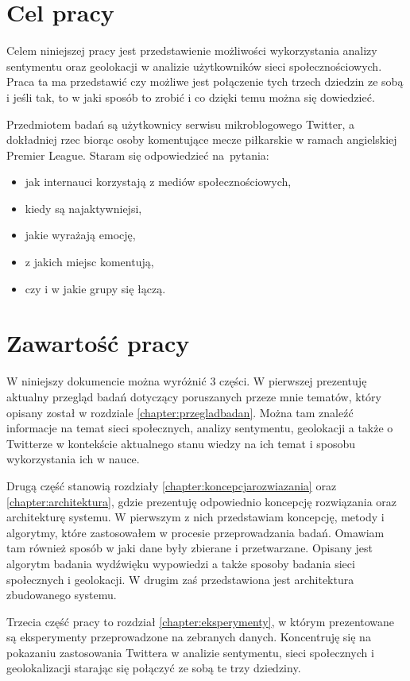 \section{Cel pracy}
Celem niniejszej pracy jest przedstawienie możliwości wykorzystania
analizy sentymentu oraz geolokacji w analizie użytkowników sieci
społecznościowych. Praca ta ma przedstawić czy możliwe jest połączenie tych
trzech dziedzin ze sobą i jeśli tak, to w jaki sposób to zrobić i co dzięki
temu można się dowiedzieć.

Przedmiotem badań są użytkownicy serwisu mikroblogowego Twitter, a dokładniej
rzec biorąc osoby komentujące mecze piłkarskie w ramach angielskiej Premier
League.
Staram się odpowiedzieć na~pytania:
\begin{itemize}
  \item jak internauci korzystają z mediów społecznościowych,
  \item kiedy są najaktywniejsi,
  \item jakie wyrażają emocję,
  \item z jakich miejsc komentują,
  \item czy i w jakie grupy się łączą.
\end{itemize}

\section{Zawartość pracy}
W niniejszy dokumencie można wyróżnić 3 części. W pierwszej prezentuję
aktualny przegląd badań dotyczący poruszanych przeze mnie tematów, który
opisany został w rozdziale \ref{chapter:przegladbadan}. Można tam znaleźć
informacje na temat sieci społecznych, analizy sentymentu, geolokacji
a także o Twitterze w kontekście aktualnego stanu wiedzy na ich temat i sposobu
wykorzystania ich w nauce.

Drugą część stanowią rozdziały \ref{chapter:koncepcjarozwiazania} oraz
\ref{chapter:architektura}, gdzie prezentuję odpowiednio koncepcję rozwiązania
oraz architekturę systemu. W pierwszym z nich przedstawiam koncepcję, metody i
algorytmy, które zastosowałem w procesie przeprowadzania badań. Omawiam tam
również sposób w jaki dane były zbierane i przetwarzane. Opisany jest algorytm
badania wydźwięku wypowiedzi a także sposoby badania sieci społecznych i
geolokacji. W drugim zaś przedstawiona jest architektura zbudowanego systemu.

Trzecia część pracy to rozdział \ref{chapter:eksperymenty}, w którym
prezentowane są eksperymenty przeprowadzone na zebranych danych.
Koncentruję się na pokazaniu zastosowania Twittera w analizie
sentymentu, sieci społecznych i geolokalizacji starając się połączyć
ze sobą te trzy dziedziny.

